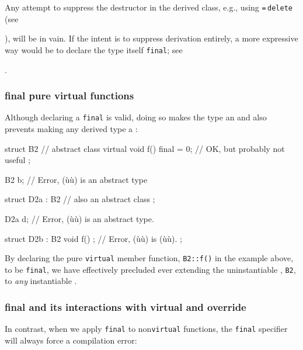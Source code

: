 \noindent Any attempt to suppress the destructor in the derived class, e.g., using
\lstinline!=!\,\lstinline!delete! (see {), will
be in vain. If the intent is to suppress derivation entirely, a more
expressive way would be to declare the type itself \lstinline!final!; see
{.

\subsubsection[\lstinline!final! pure virtual functions]{{\SubsubsecCode final} pure virtual functions}\label{final-pure-virtual-functions}

Although declaring a  \lstinline!final! is
valid, doing so makes the type an  and also
prevents making any derived type a :

\begin{emcppslisting}
struct B2  // abstract class
{
    virtual void f() final = 0;  // OK, but probably not useful
};

B2 b;  // Error, (ù{}ù) is an abstract type

struct D2a : B2  // also an abstract class
{
};

D2a d;  // Error, (ù{}ù) is an abstract type.

struct D2b : B2
{
    void f() {};  // Error, (ù{}ù) is (ù{}ù).
};
\end{emcppslisting}
    

\noindent By declaring the pure \lstinline!virtual! member function, \lstinline!B2::f()!
in the example above, to be \lstinline!final!, we have effectively
precluded ever extending the uninstantiable ,
\lstinline!B2!, to \emph{any} instantiable .

\subsubsection[\lstinline!final! and its interactions with \lstinline!virtual! and \lstinline!override!]{{\SubsubsecCode final} and its interactions with {\SubsubsecCode virtual} and {\SubsubsecCode override}}\label{final-and-its-interactions-with-virtual-and-override}

In contrast, when we apply \lstinline!final! to non\lstinline!virtual!
functions, the \lstinline!final! specifier will always force a compilation
error:

}}
